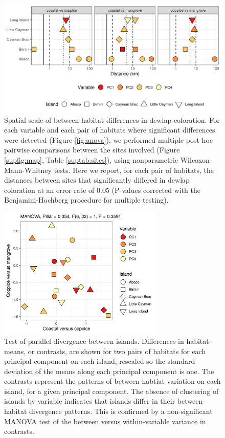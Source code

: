 \begin{figure}[H]
	\centering
	\includegraphics[width=\textwidth]{suppfigures/figure_distances2.png}
	\caption{Spatial scale of between-habitat differences in dewlap coloration. For each variable and each pair of habitats where significant differences were detected (Figure \ref{fig:anova}), we performed multiple post hoc pairwise comparisons between the sites involved (Figure \ref{supfig:map}, Table \ref{suptab:sites}), using nonparametric Wilcoxon-Mann-Whitney tests. Here we report, for each pair of habitats, the distances between sites that significantly differed in dewlap coloration at an error rate of 0.05 (P-values corrected with the Benjamini-Hochberg procedure for multiple testing).}
	\label{supfig:distances}
\end{figure}

\begin{figure}[H]
	\centering
	\includegraphics[width=0.7\textwidth]{suppfigures/figure_contrasts.png}
	\caption{Test of parallel divergence between islands. Differences in habitat-means, or contrasts, are shown for two pairs of habitats for each principal component on each island, rescaled so the standard deviation of the means along each principal component is one. The contrasts represent the patterns of between-habtiat variation on each island, for a given principal component. The absence of clustering of islands by variable indicates that islands differ in their between-habitat divergence patterns. This is confirmed by a non-significant MANOVA test of the between versus within-variable variance in contrasts.}
	\label{supfig:contrasts}
\end{figure}